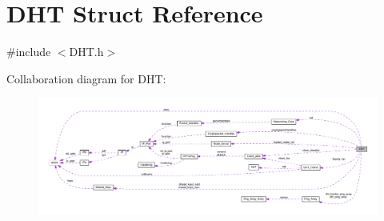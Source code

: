 \hypertarget{struct_d_h_t}{\section{D\+H\+T Struct Reference}
\label{struct_d_h_t}
}


{\ttfamily \#include $<$D\+H\+T.\+h$>$}



Collaboration diagram for D\+H\+T\+:
\nopagebreak
\begin{figure}[H]
\begin{center}
\leavevmode
\includegraphics[width=350pt]{d9/d93/struct_d_h_t__coll__graph}
\end{center}
\end{figure}
